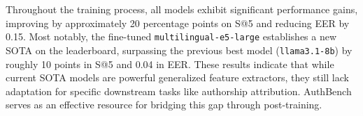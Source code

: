 \documentclass[11pt]{article}
\begin{document}
Throughout the training process, all models exhibit significant performance gains, improving by approximately 20 percentage points on S@5 and reducing EER by 0.15. Most notably, the fine-tuned \texttt{multilingual-e5-large} establishes a new SOTA on the leaderboard, surpassing the previous best model (\texttt{llama3.1-8b}) by roughly 10 points in S@5 and 0.04 in EER. These results indicate that while current SOTA models are powerful generalized feature extractors, they still lack adaptation for specific downstream tasks like authorship attribution. AuthBench serves as an effective resource for bridging this gap through post-training.



\end{document}
